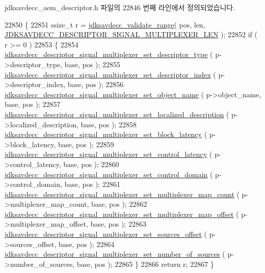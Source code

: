 jdksavdecc\+\_\+aem\+\_\+descriptor.\+h 파일의 22846 번째 라인에서 정의되었습니다.


\begin{DoxyCode}
22850 \{
22851     ssize\_t r = \hyperlink{group__util_ga9c02bdfe76c69163647c3196db7a73a1}{jdksavdecc\_validate\_range}( pos, len, 
      \hyperlink{group__descriptor__signal__multiplexer_ga300d29c873c2da91e9cbdf1a73dd62f1}{JDKSAVDECC\_DESCRIPTOR\_SIGNAL\_MULTIPLEXER\_LEN} );
22852     \textcolor{keywordflow}{if} ( r >= 0 )
22853     \{
22854         \hyperlink{group__descriptor__signal__multiplexer_gae8063469ca2ca12533da43c70e96caab}{jdksavdecc\_descriptor\_signal\_multiplexer\_set\_descriptor\_type}
      ( p->descriptor\_type, base, pos );
22855         \hyperlink{group__descriptor__signal__multiplexer_gadac09d1ef21ba14109a80559310be8f0}{jdksavdecc\_descriptor\_signal\_multiplexer\_set\_descriptor\_index}
      ( p->descriptor\_index, base, pos );
22856         \hyperlink{group__descriptor__signal__multiplexer_gabcf68f5e1d3b811a5f20c4a38259ba34}{jdksavdecc\_descriptor\_signal\_multiplexer\_set\_object\_name}
      ( p->object\_name, base, pos );
22857         \hyperlink{group__descriptor__signal__multiplexer_ga44f805522fed23de078407a8f555b108}{jdksavdecc\_descriptor\_signal\_multiplexer\_set\_localized\_description}
      ( p->localized\_description, base, pos );
22858         \hyperlink{group__descriptor__signal__multiplexer_ga840e7509b974fbe51902ed655a5631e8}{jdksavdecc\_descriptor\_signal\_multiplexer\_set\_block\_latency}
      ( p->block\_latency, base, pos );
22859         \hyperlink{group__descriptor__signal__multiplexer_gad1559d27aec0c840036aa4b5a8be41f1}{jdksavdecc\_descriptor\_signal\_multiplexer\_set\_control\_latency}
      ( p->control\_latency, base, pos );
22860         \hyperlink{group__descriptor__signal__multiplexer_ga9067e5cdce9b08ffcec691f1203840ee}{jdksavdecc\_descriptor\_signal\_multiplexer\_set\_control\_domain}
      ( p->control\_domain, base, pos );
22861         \hyperlink{group__descriptor__signal__multiplexer_ga2b0d324ba223cc94ca23d98ea5f00a51}{jdksavdecc\_descriptor\_signal\_multiplexer\_set\_multiplexer\_map\_count}
      ( p->multiplexer\_map\_count, base, pos );
22862         \hyperlink{group__descriptor__signal__multiplexer_ga9546a1e90a5fc80090ac82f6cde89f5b}{jdksavdecc\_descriptor\_signal\_multiplexer\_set\_multiplexer\_map\_offset}
      ( p->multiplexer\_map\_offset, base, pos );
22863         \hyperlink{group__descriptor__signal__multiplexer_ga9b8ac86c9b4f59a7756bdc7c1e465c38}{jdksavdecc\_descriptor\_signal\_multiplexer\_set\_sources\_offset}
      ( p->sources\_offset, base, pos );
22864         \hyperlink{group__descriptor__signal__multiplexer_ga0efe2bf77e4ad18b1adcd05a8cbb87b7}{jdksavdecc\_descriptor\_signal\_multiplexer\_set\_number\_of\_sources}
      ( p->number\_of\_sources, base, pos );
22865     \}
22866     \textcolor{keywordflow}{return} r;
22867 \}
\end{DoxyCode}


